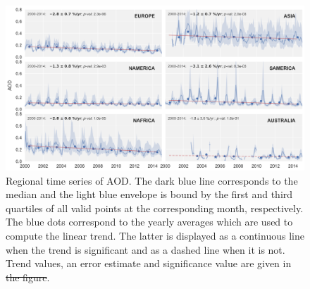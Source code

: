 \documentclass[acp, manuscript]{copernicus}
\providecommand{\DIFadd}[1]{{\protect\color{blue}\uwave{#1}}} %
\providecommand{\DIFdel}[1]{{\protect\color{red}\sout{#1}}}                      %
\providecommand{\DIFaddFL}[1]{\DIFadd{#1}} %
\providecommand{\DIFdelFL}[1]{\DIFdel{#1}} %
\providecommand{\DIFaddbeginFL}{} %
\providecommand{\DIFaddendFL}{} %
\providecommand{\DIFdelbeginFL}{} %
\providecommand{\DIFdelendFL}{} %
\begin{document}
\clearpage
\begin{figure}
 \includegraphics[width=16cm]{../scripts/figs/ts/panel-od550aer.png}
 \caption{Regional time series of AOD. The dark blue line corresponds to the median and the light blue envelope is bound by the first and third quartiles of all valid points at the corresponding month, respectively. The blue dots correspond to the yearly averages which are used to compute the linear trend. The latter is displayed as a continuous line when the trend is significant and as a dashed line when it is not. Trend values, an error estimate and significance value are given in \DIFdelbeginFL \DIFdelFL{the figure}\DIFdelendFL \DIFaddbeginFL \DIFaddFL{each pane}\DIFaddendFL .}
 \label{fig:ts_aod}
\end{figure}
\end{document}
